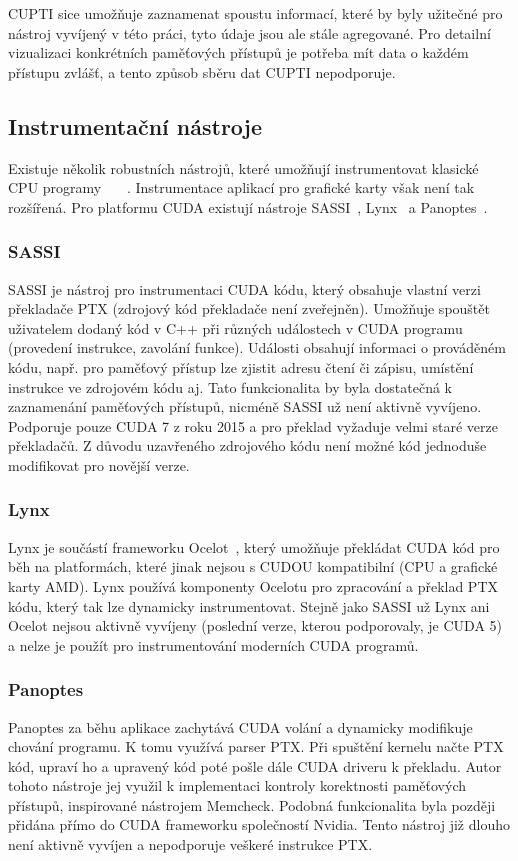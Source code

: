CUPTI sice umožňuje zaznamenat spoustu informací, které by byly užitečné pro nástroj vyvíjený v této práci, tyto údaje jsou ale stále agregované. Pro detailní vizualizaci konkrétních paměťových přístupů je potřeba mít data o každém přístupu zvlášť, a tento způsob sběru dat CUPTI nepodporuje.

\subsection{Instrumentační nástroje}
Existuje několik robustních nástrojů, které umožňují instrumentovat klasické CPU programy~\cite{valgrind}~\cite{pin} ~\cite{dynamorio}. Instrumentace aplikací pro grafické karty však není tak rozšířená. Pro platformu CUDA existují nástroje SASSI~\cite{sassi}, Lynx~\cite{lynx} a Panoptes~\cite{panoptes}.

\subsubsection*{SASSI}
SASSI je nástroj pro instrumentaci CUDA kódu, který obsahuje vlastní verzi překladače PTX (zdrojový kód překladače není zveřejněn). Umožňuje spouštět uživatelem dodaný kód v C++ při různých událostech v CUDA programu (provedení instrukce, zavolání funkce). Události obsahují informaci o prováděném kódu, např. pro paměťový přístup lze zjistit adresu čtení či zápisu, umístění instrukce ve zdrojovém kódu aj. Tato funkcionalita by byla dostatečná k zaznamenání paměťových přístupů, nicméně SASSI už není aktivně vyvíjeno. Podporuje pouze CUDA 7 z roku 2015 a pro překlad vyžaduje velmi staré verze překladačů. Z důvodu uzavřeného zdrojového kódu není možné kód jednoduše modifikovat pro novější verze.

\subsubsection*{Lynx}
Lynx je součástí frameworku Ocelot~\cite{ocelot}, který umožňuje překládat CUDA kód pro běh na platformách, které jinak nejsou s CUDOU kompatibilní (CPU a grafické karty AMD). Lynx používá komponenty Ocelotu pro zpracování a překlad PTX kódu, který tak lze dynamicky instrumentovat. Stejně jako SASSI už Lynx ani Ocelot nejsou aktivně vyvíjeny (poslední verze, kterou podporovaly, je CUDA 5) a nelze je použít pro instrumentování moderních CUDA programů.

\subsubsection*{Panoptes}
Panoptes za běhu aplikace zachytává CUDA volání a dynamicky modifikuje chování programu. K tomu využívá parser PTX. Při spuštění kernelu načte PTX kód, upraví ho a upravený kód poté pošle dále CUDA driveru k překladu. Autor tohoto nástroje jej využil k implementaci kontroly korektnosti paměťových přístupů, inspirované nástrojem Memcheck. Podobná funkcionalita byla později přidána přímo do CUDA frameworku společností Nvidia. Tento nástroj již dlouho není aktivně vyvíjen a nepodporuje veškeré instrukce PTX.

